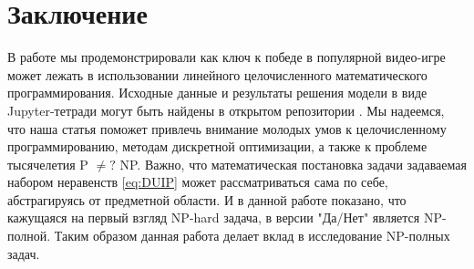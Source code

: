 \documentclass{article}
\begin{document}
\section{Заключение}
\label{SectionConclusion}
В работе мы продемонстрировали как ключ к победе в популярной видео-игре может лежать в использовании линейного целочисленного математического программирования. 
Исходные данные и результаты решения модели в виде Jupyter-тетради могут быть найдены в открытом репозитории \cite{UnderLordsInput}.
Мы надеемся, что наша статья поможет привлечь внимание молодых умов к целочисленному программированию, методам дискретной оптимизации, а также к проблеме тысячелетия P $\neq ?$ NP. 
Важно, что математическая постановка задачи задаваемая набором неравенств \eqref{eq:DUIP} может  рассматриваться сама по себе, абстрагируясь от предметной области. И в данной работе показано, что кажущаяся на первый взгляд NP-hard задача, в версии "Да/Нет" является NP-полной. 
Таким образом данная работа делает вклад в исследование NP-полных задач. 



\end{document}
